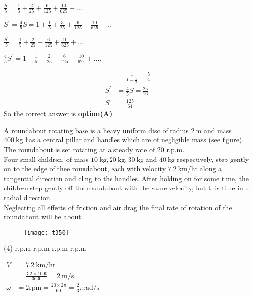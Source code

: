 \begin{questions}
\begin{answer}
	$\frac{S}{5}=\frac{1}{5}+\frac{2}{25}+\frac{6}{125}+\frac{10}{625}+\ldots$
	
	$S^{\prime}=\frac{4}{5} S=1+\frac{1}{5}+\frac{3}{25}+\frac{6}{125}+\frac{10}{625}+\ldots$
	
	$\frac{S^{\prime}}{5}=\frac{1}{5}+\frac{2}{25}+\frac{6}{125}+\frac{10}{625}+\ldots$
	
	$\frac{4}{5} S^{\prime}=1+\frac{1}{5}+\frac{2}{25}+\frac{6}{125}+\frac{10}{625}+\ldots .$
	
	$$
	\begin{aligned}
	&=\frac{1}{1-\frac{1}{5}}=\frac{5}{4} \\
	S^{\prime} &=\frac{4}{5} S=\frac{25}{16} \\
	S &=\frac{125}{64}
	\end{aligned}
	$$
	So the correct answer is \textbf{option(A)}
\end{answer}
\begin{minipage}{\textwidth}
	\question A roundabout rotating base is a heavy uniform disc of radius $2 \mathrm{~m}$ and mass $400 \mathrm{~kg}$ has a central pillar and handles which are of negligible mass (see figure). The roundabout is set rotating at a steady rate of 20 r.p.m.\\
	Four small children, of mass $10 \mathrm{~kg}, 20 \mathrm{~kg}, 30 \mathrm{~kg}$ and $40 \mathrm{~kg}$ respectively, step gently on to the edge of thee roundabout, each with velocity $7.2 \mathrm{~km} / \mathrm{hr}$ along a tangential direction and cling to the handles. After holding on for some time, the children step gently off the roundabout with the same velocity, but this time in a radial direction.\\
	Neglecting all effects of friction and air drag the final rate of rotation of the roundabout will be about
\end{minipage}
\begin{figure}[H]
	\centering
	\texttt{[image: t350]}
\end{figure}
\begin{tasks}(4)
	 r.p.m
	 r.p.m
	 r.p.m
	 r.p.m
\end{tasks}
\begin{answer}$\left. \right. $\\
	$\begin{aligned} V &=7.2 \mathrm{~km} / \mathrm{hr} \\ &=\frac{7.2 \times 1000}{3600}=2 \mathrm{~m} / \mathrm{s} \\ \omega &=2 \mathrm{rpm}=\frac{20 \times 2 \pi}{60}=\frac{2}{3} \pi \mathrm{rad} / \mathrm{s} \end{aligned}$\\

\end{answer}
\end{questions}
